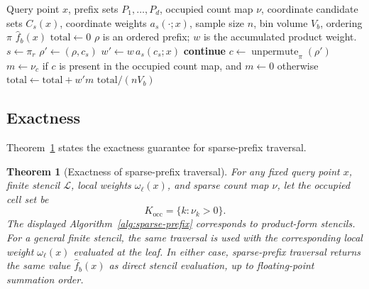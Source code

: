 \documentclass[pdflatex,sn-mathphys-ay]{sn-jnl}
\theoremstyle{thmstyleone}
\newtheorem{theorem}{Theorem}
\newcommand{\fhatb}{\widehat{f}_b}
\newcommand{\stencil}{\mathcal{L}}
\begin{document}
\begin{algorithm}[H]
\caption{Sparse-prefix traversal}
\label{alg:sparse-prefix}
\begin{algorithmic}[1]
\Require Query point \(x\), prefix sets \(P_1,\ldots,P_d\), occupied count map \(\nu\), coordinate candidate sets \(C_s(x)\), coordinate weights \(a_s(\cdot;x)\), sample size \(n\), bin volume \(V_b\), ordering \(\pi\)
\Ensure \(\fhatb(x)\)
\State \(\mathrm{total} \gets 0\)
\Statex \(\rho\) is an ordered prefix; \(w\) is the accumulated product weight.
  \State \(s \gets \pi_r\)
    \State \(\rho' \gets (\rho,c_s)\)
    \State \(w' \gets w\,a_s(c_s;x)\)
      \State \textbf{continue} 
    \EndIf
      \State \(c \gets \operatorname{unpermute}_{\pi}(\rho')\)
      \State \(m \gets \nu_c\) if \(c\) is present in the occupied count map, and \(m \gets 0\) otherwise
      \State \(\mathrm{total} \gets \mathrm{total}+w'm\)
    \Else
      \State {}
    \EndIf
  \EndFor
\EndProcedure
\State {}
\State \Return \(\mathrm{total}/(nV_b)\)
\end{algorithmic}
\end{algorithm}

\subsection{Exactness}

Theorem~\ref{thm:sparse-exactness} states the exactness guarantee for sparse-prefix traversal.

\begin{theorem}[Exactness of sparse-prefix traversal]
\label{thm:sparse-exactness}
For any fixed query point \(x\), finite stencil \(\stencil\), local weights \(\omega_\ell(x)\), and sparse count map \(\nu\), let the occupied cell set be
\[
K_{\mathrm{occ}}
=
\{k:\nu_k>0\}.
\]
The displayed Algorithm~\ref{alg:sparse-prefix} corresponds to product-form stencils. For a general finite stencil, the same traversal is used with the corresponding local weight \(\omega_\ell(x)\) evaluated at the leaf. In either case, sparse-prefix traversal returns the same value \(\fhatb(x)\) as direct stencil evaluation, up to floating-point summation order.
\end{theorem}
\end{document}
